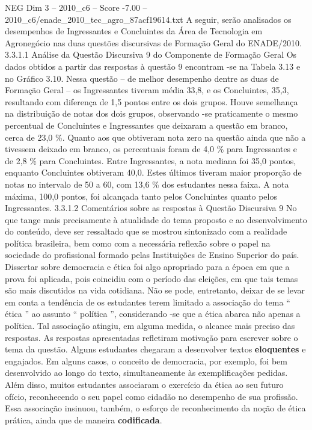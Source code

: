 \begin{textsample}{NEG Dim 3 – 2010\_c6 – Score -7.00 – 2010\_c6/enade\_2010\_tec\_agro\_87acf19614.txt}
A seguir, serão analisados os desempenhos de Ingressantes e Concluintes da Área de Tecnologia em Agronegócio nas duas questões discursivas de Formação Geral do ENADE/2010. 3.3.1.1 Análise da Questão Discursiva 9 do Componente de Formação Geral Os dados obtidos a partir das respostas à questão 9 encontram -se na Tabela 3.13 e no Gráfico 3.10.
Nessa questão – de melhor desempenho dentre as duas de Formação Geral – os Ingressantes tiveram média 33,8, e os Concluintes, 35,3, resultando com diferença de 1,5 pontos entre os dois grupos.
Houve semelhança na distribuição de notas dos dois grupos, observando -se praticamente o mesmo percentual de Concluintes e Ingressantes que deixaram a questão em branco, cerca de 23,0 \%.
Quanto aos que obtiveram nota zero na questão ainda que não a tivessem deixado em branco, os percentuais foram de 4,0 \% para Ingressantes e de 2,8 \% para Concluintes.
Entre Ingressantes, a nota mediana foi 35,0 pontos, enquanto Concluintes obtiveram 40,0.
Estes últimos tiveram maior proporção de notas no intervalo de 50 a 60, com 13,6 \% dos estudantes nessa faixa.
A nota máxima, 100,0 pontos, foi alcançada tanto pelos Concluintes quanto pelos Ingressantes. 3.3.1.2 Comentários sobre as respostas à Questão Discursiva 9 No que tange mais precisamente à atualidade do tema proposto e ao desenvolvimento do conteúdo, deve ser ressaltado que se mostrou sintonizado com a realidade política brasileira, bem como com a necessária reflexão sobre o papel na sociedade do profissional formado pelas Instituições de Ensino Superior do país.
Dissertar sobre democracia e ética foi algo apropriado para a época em que a prova foi aplicada, pois coincidiu com o período das eleições, em que tais temas são mais discutidos na vida cotidiana.
Não se pode, entretanto, deixar de se levar em conta a tendência de os estudantes terem limitado a associação do tema “ ética ” ao assunto “ política ”, considerando -se que a ética abarca não apenas a política.
Tal associação atingiu, em alguma medida, o alcance mais preciso das respostas.
As respostas apresentadas refletiram motivação para escrever sobre o tema da questão.
Alguns estudantes chegaram a desenvolver textos \textbf{eloquentes} e engajados.
Em alguns casos, o conceito de democracia, por exemplo, foi bem desenvolvido ao longo do texto, simultaneamente às exemplificações pedidas.
Além disso, muitos estudantes associaram o exercício da ética ao seu futuro ofício, reconhecendo o seu papel como cidadão no desempenho de sua profissão.
Essa associação insinuou, também, o esforço de reconhecimento da noção de ética prática, ainda que de maneira \textbf{codificada}.

\end{textsample}
